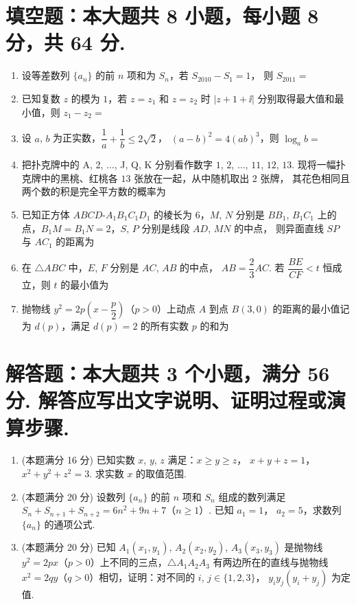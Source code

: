 \documentclass{chsmc}
\begin{document}
\section{填空题：本大题共 8 小题，每小题 8 分，共 64 分.}

\begin{enumerate}
	\item 设等差数列 $\{a_n\}$ 的前 $n$ 项和为 $S_n$，若 $S_{2010} - S_1 = 1$，
		则 $S_{2011} =$ \blankline
	\item 已知复数 $z$ 的模为 $1$，若 $z = z_1$ 和 $z = z_2$ 时
		$|z + 1 + \ii|$ 分别取得最大值和最小值，则 $z_1 - z_2 =$ \blankline
	\item 设 $a$, $b$ 为正实数，$\dfrac{1}{a} + \dfrac{1}{b} \leqslant 2\sqrt{2}$，
		$(a-b)^2 = 4(ab)^3$，则 $\log_a b =$ \blankline
	\item 把扑克牌中的 A, 2, $\ldots$, J, Q, K 分别看作数字 $1$, $2$, $\ldots$, $11$, $12$, $13$.
		现将一幅扑克牌中的黑桃、红桃各 $13$ 张放在一起，从中随机取出 $2$ 张牌，
		其花色相同且两个数的积是完全平方数的概率为 \blankline
	\item 已知正方体 $ABCD$-$A_1B_1C_1D_1$ 的棱长为 $6$，$M$, $N$ 分别是 $BB_1$, $B_1C_1$
		上的点，$B_1M = B_1N = 2$，$S$, $P$ 分别是线段 $AD$, $MN$ 的中点，
		则异面直线 $SP$ 与 $AC_1$ 的距离为 \blankline
	\item 在 $\triangle ABC$ 中，$E$, $F$ 分别是 $AC$, $AB$ 的中点，
		$AB = \dfrac{2}{3}AC$. 若 $\dfrac{BE}{CF} < t$ 恒成立，则 $t$ 的最小值为 \blankline
	\item 抛物线 $y^2 = 2p\left(x - \dfrac{p}{2}\right)$（$p > 0$）上动点 $A$ 到点 $B(3,0)$
		的距离的最小值记为 $d(p)$，满足 $d(p) = 2$ 的所有实数 $p$ 的和为 \blankline
\end{enumerate}

\section{解答题：本大题共 3 个小题，满分 56 分. 解答应写出文字说明、证明过程或演算步骤.}

\begin{enumerate}[resume]
	\item (本题满分 16 分) 已知实数 $x$, $y$, $z$ 满足：$x \geqslant y \geqslant z$，
		$x + y + z = 1$，$x^2 + y^2 + z^2 = 3$. 求实数 $x$ 的取值范围.
	\item (本题满分 20 分) 设数列 $\{a_n\}$ 的前 $n$ 项和 $S_n$ 组成的数列满足
		$S_n + S_{n+1} + S_{n+2} = 6n^2 + 9n + 7$（$n \geqslant 1$）. 已知 $a_1 = 1$，
		$a_2 = 5$，求数列 $\{a_n\}$ 的通项公式.
	\item (本题满分 20 分) 已知 $A_1(x_1,y_1)$, $A_2(x_2,y_2)$, $A_3(x_3,y_3)$ 是抛物线
		$y^2 = 2px$（$p > 0$）上不同的三点，$\triangle A_1A_2A_3$ 有两边所在的直线与抛物线
		$x^2 = 2qy$（$q > 0$）相切，证明：对不同的 $i$, $j \in \{1,2,3\}$，
		$y_i y_j (y_i + y_j)$ 为定值.
\end{enumerate}
\end{document}
